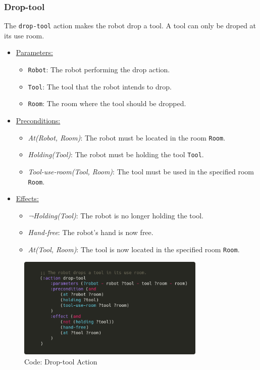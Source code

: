 \documentclass{article}
\begin{document}
\subsubsection{Drop-tool}
The \texttt{drop-tool} action makes the robot drop a tool. A tool can only be droped at its use room.
\begin{itemize}
    \item \underline{Parameters:}
    \begin{itemize}
        \item \texttt{Robot}: The robot performing the drop action.
        \item \texttt{Tool}: The tool that the robot intends to drop.
        \item \texttt{Room}: The room where the tool should be dropped.
    \end{itemize}
    \item \underline{Preconditions:}
    \begin{itemize}
        \item \textit{At(Robot, Room)}: The robot must be located in the room \texttt{Room}.
        \item \textit{Holding(Tool)}: The robot must be holding the tool \texttt{Tool}.
        \item \textit{Tool-use-room(Tool, Room)}: The tool must be used in the specified room \texttt{Room}.
    \end{itemize}
    \item \underline{Effects:}
    \begin{itemize}
        \item \textit{¬Holding(Tool)}: The robot is no longer holding the tool.
        \item \textit{Hand-free}: The robot’s hand is now free.
        \item \textit{At(Tool, Room)}: The tool is now located in the specified room \texttt{Room}.
    \end{itemize}
    \end{itemize}
\begin{figure}[ht]
    \centering
    \includegraphics[width=0.80\textwidth]{assets/drop-tool.png}
    \caption{Code: Drop-tool Action}
    \label{fig:act:drop-tool}
\end{figure}
\end{document}
